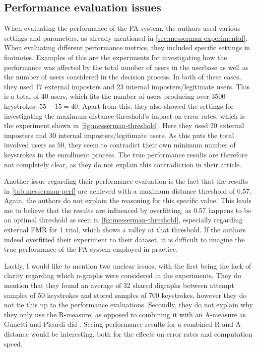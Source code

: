 \documentclass[informationsecurity]{gucmasterproject}
\begin{document}
\subsection{Performance evaluation issues}
When evaluating the performance of the PA system, the authors used various settings and parameters, as already mentioned in \cref{sec:messerman-experimental}.
When evaluating different performance metrics, they included specific settings in footnotes.
Examples of this are the experiments for investigating how the performance was affected by the total number of users in the userbase as well as the number of users considered in the decision process.
In both of these cases, they used 17 external imposters and 23 internal imposters/legitimate users.
This is a total of 40 users, which fits the number of users producing over 3500 keystrokes: $55-15=40$.
Apart from this, they also showed the settings for investigating the maximum distance threshold's impact on error rates, which is the experiment shown in \cref{fig:messerman-threshold}.
Here they used 20 external imposters and 30 internal imposters/legitimate users.
As this puts the total involved users as 50, they seem to contradict their own minimum number of keystrokes in the enrollment process.
The true performance results are therefore not completely clear, as they do not explain this contradiction in their article.

Another issue regarding their performance evaluation is the fact that the results in \cref{tab:messerman-perf} are achieved with a maximum distance threshold of 0.57.
Again, the authors do not explain the reasoning for this specific value.
This leads me to believe that the results are influenced by overfitting, as 0.57 happens to be an optimal threshold as seen in \cref{fig:messerman-threshold}, especially regarding external FMR for 1 trial, which shows a valley at that threshold.
If the authors indeed overfitted their experiment to their dataset, it is difficult to imagine the true performance of the PA system employed in practice.

Lastly, I would like to mention two unclear issues, with the first being the lack of clarity regarding which n-graphs were considered in the experiments.
They do mention that they found an average of 32 shared digraphs between attempt samples of 50 keystrokes and stored samples of 700 keystrokes, however they do not tie this up to the performance evaluations.
Secondly, they do not explain why they only use the R-measure, as opposed to combining it with an A-measure as Gunetti and Picardi did \cite{gnp}.
Seeing performance results for a combined R and A distance would be interesting, both for the effects on error rates and computation speed.
\end{document}
